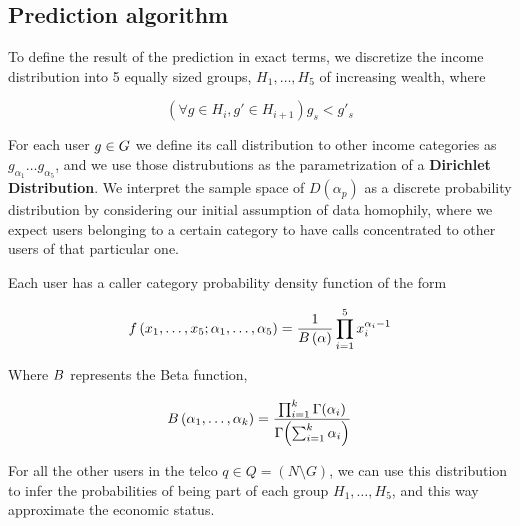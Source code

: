 \subsection{Prediction algorithm}

To define the result of the prediction in exact terms, we discretize the income distribution into 5 equally sized groups, $ H_1, \ldots, H_5 $ of increasing wealth, where

\[
\left( \forall g \in H_i, g' \in H_{i + 1} \right) g_s < g'_s
\]

For each user $ g \in \mathlarger{G} $ we define its call distribution to other income categories as $ g_{\alpha_1} \ldots g_{\alpha_5} $, and we use those distrubutions as the parametrization of a \textbf{Dirichlet Distribution}. We interpret the sample space of $ D(\alpha_p) $ as a discrete probability distribution by considering our initial assumption of data homophily, where we expect users belonging to a certain category to have calls concentrated to other users of that particular one.

Each user has a caller category probability density function of the form

\[
f \left( x_1, \ldots, x_5; \alpha_1, \ldots, \alpha_5 \right) = \frac{1}{B \left( \alpha \right)} \prod^5_{i = 1} x_i^{\alpha_i - 1}
\]

Where $ B $ represents the Beta function,

\[
B \left( \alpha_1, \ldots, \alpha_k \right) = \frac{\prod^k_{i = 1} \Gamma \! \left( \alpha_i \right)}{\Gamma \! \left( \sum^k_{i = 1} \alpha_i \right) }
\]

For all the other users in the telco $ q \in Q = (N \setminus G) $, we can use this distribution to infer the probabilities of being part of each group $ H_1, \ldots, H_5 $, and this way approximate the economic status.
